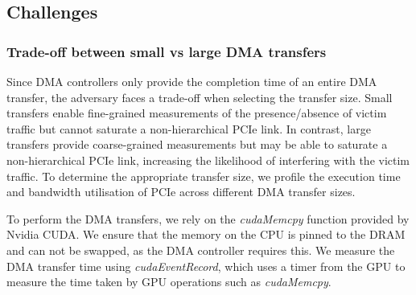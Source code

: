 \subsection{Challenges}
\label{subsec:interconnect-sc-dma-challenges}

\subsubsection{Trade-off between small vs large DMA transfers}
\label{subsubsec:interconnect-sc-dma-challenges-trade-off-small-v-large-tx}

Since DMA controllers only provide the completion time of an entire DMA transfer, the adversary faces a trade-off when selecting the transfer size. 
Small transfers enable fine-grained measurements of the presence/absence of victim traffic but cannot saturate a non-hierarchical PCIe link. 
In contrast, large transfers provide coarse-grained measurements but may be able to saturate a non-hierarchical PCIe link, increasing the likelihood of interfering with the victim traffic.
To determine the appropriate transfer size, we profile the execution time and bandwidth utilisation of PCIe across different DMA transfer sizes.

To perform the DMA transfers, we rely on the \textit{cudaMemcpy} function provided by Nvidia CUDA.
We ensure that the memory on the CPU is pinned to the DRAM and can not be swapped, as the DMA controller requires this.
We measure the DMA transfer time using \textit{cudaEventRecord}, which uses a timer from the GPU to measure the time taken by GPU operations such as \textit{cudaMemcpy}.



